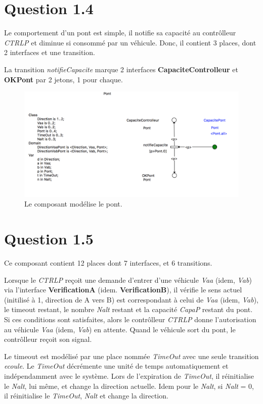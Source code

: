 \documentclass[a4paper,11pt]{report}
\begin{document}
	
\section{Question 1.4}
	Le comportement d'un pont est simple, il notifie  sa capacité au contrôlleur \textit{CTRLP} et diminue si consommé par un véhicule. Donc, il contient 3 places, dont 2 interfaces et une transition.
	
	La transition \textit{notifieCapacite} marque 2 interfaces \textbf{CapaciteControlleur} et \textbf{OKPont} par 2 jetons, 1 pour chaque.

	\begin{figure}[!htbp]
		\centering
		\includegraphics[width = 15cm]{pontModel.png}
		\caption{Le composant modélise le pont.}
	\end{figure}
	\newpage
	
\section{Question 1.5}
	Ce composant contient 12 places dont 7 interfaces, et 6 transitions.
	
	Lorsque le \textit{CTRLP} reçoit une demande d'entrer d'une véhicule \textit{Vaa} (idem, \textit{Vab}) via l'interface \textbf{VerificationA} (idem. \textbf{VerificationB}), il vérifie le sens actuel (initilisé à 1, direction de A vers B) est correspondant à celui de \textit{Vaa} (idem, \textit{Vab}), le timeout restant, le nombre \textit{Nalt} restant et la capacité \textit{CapaP} restant du pont. Si ces conditions sont satisfaites, alors le contrôlleur \textit{CTRLP} donne l'autorisation au véhicule \textit{Vaa} (idem, \textit{Vab}) en attente. Quand le véhicule sort du pont, le contrôlleur reçoit son signal. 
	
	Le timeout est modélisé par une place nommée \textit{TimeOut} avec une seule transition \textit{ecoule}. Le \textit{TimeOut} décrémente une unité de temps automatiquement et indépendamment avec le système. Lors de l'expiration de \textit{TimeOut}, il réinitialise le \textit{Nalt}, lui même, et change la direction actuelle.  Idem pour le \textit{Nalt}, si \textit{Nalt} = 0, il réinitialise le \textit{TimeOut}, \textit{Nalt} et change la direction.
	
\end{document}
